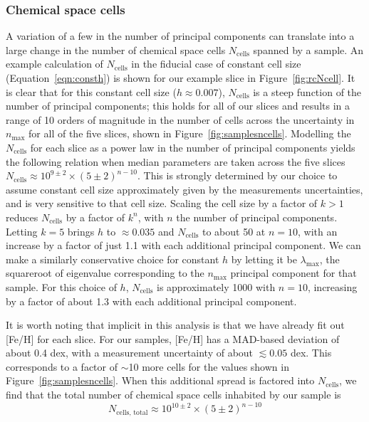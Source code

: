 \documentclass[a4paper,fleqn,usenatbib]{mnras}
\begin{document}
\subsubsection{Chemical space cells}
A variation of a few in the number of principal components can translate into a large change in the number of chemical space cells $N_{\mathrm{cells}}$ spanned by a sample. An example calculation of $N_{\mathrm{cells}}$ in the fiducial case of constant cell size (Equation~\eqref{eqn:consth}) is shown for our example slice in Figure~\ref{fig:rcNcell}. It is clear that for this constant cell size ($h\approx 0.007$), $N_{\mathrm{cells}}$ is a steep function of the number of principal components; this holds for all of our slices and results in a range of 10 orders of magnitude in the number of cells across the uncertainty in $n_{\max}$ for all of the five slices, shown in Figure~\ref{fig:samplesncells}. Modelling the $N_{\mathrm{cells}}$ for each slice as a power law in the number of principal components yields the following relation when median parameters are taken across the five slices $N_{\mathrm{cells}} \approx 10^{9\pm2} \times (5\pm 2)^{n-10}$. This is strongly determined by our choice to assume constant cell size approximately given by the measurements uncertainties, and is very sensitive to that cell size. Scaling the cell size by a factor of $k>1$ reduces $N_{\mathrm{cells}}$ by a factor of $k^n$, with $n$ the number of principal components. Letting $k=5$ brings $h$ to $\approx 0.035$ and $N_{\mathrm{cells}}$ to about 50 at $n=10$, with an increase by a factor of just 1.1 with each additional principal component. We can make a similarly conservative choice for constant $h$ by letting it be $\lambda_{\max}$, the squareroot of eigenvalue corresponding to the $n_{\max}$ principal component for that sample. For this choice of $h$, $N_{\mathrm{cells}}$ is approximately 1000 with $n=10$, increasing by a factor of about 1.3 with each additional principal component. 

It is worth noting that implicit in this analysis is that we have already fit out [Fe/H] for each slice. For our samples, [Fe/H] has a MAD-based deviation of about 0.4 dex, with a measurement uncertainty of about $\lesssim 0.05$ dex. This corresponds to a factor of $\sim$10 more cells for the values shown in Figure~\ref{fig:samplesncells}. When this additional spread is factored into $N_{\mathrm{cells}}$, we find that the total number of chemical space cells inhabited by our sample is %
\begin{equation}
	N_{\mathrm{cells,\,total}} \approx 10^{10\pm2} \times (5\pm 2)^{n-10}
\end{equation}
\end{document}
